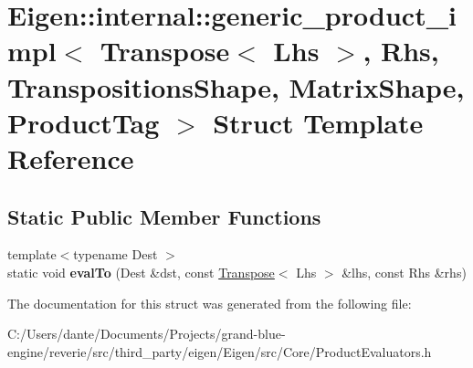\hypertarget{struct_eigen_1_1internal_1_1generic__product__impl_3_01_transpose_3_01_lhs_01_4_00_01_rhs_00_01_287c8e613c7656c0ce6593799fd7b329}{}\section{Eigen\+::internal\+::generic\+\_\+product\+\_\+impl$<$ Transpose$<$ Lhs $>$, Rhs, Transpositions\+Shape, Matrix\+Shape, Product\+Tag $>$ Struct Template Reference}
\label{struct_eigen_1_1internal_1_1generic__product__impl_3_01_transpose_3_01_lhs_01_4_00_01_rhs_00_01_287c8e613c7656c0ce6593799fd7b329}
\subsection*{Static Public Member Functions}
\begin{DoxyCompactItemize}
\item 
\mbox{\label{struct_eigen_1_1internal_1_1generic__product__impl_3_01_transpose_3_01_lhs_01_4_00_01_rhs_00_01_287c8e613c7656c0ce6593799fd7b329_a5c70fdb138733ffb2bb8ed8b41e998d8}} 
{\footnotesize template$<$typename Dest $>$ }\\static void {\bfseries eval\+To} (Dest \&dst, const \mbox{\hyperlink{class_eigen_1_1_transpose}{Transpose}}$<$ Lhs $>$ \&lhs, const Rhs \&rhs)
\end{DoxyCompactItemize}


The documentation for this struct was generated from the following file\+:\begin{DoxyCompactItemize}
\item 
C\+:/\+Users/dante/\+Documents/\+Projects/grand-\/blue-\/engine/reverie/src/third\+\_\+party/eigen/\+Eigen/src/\+Core/Product\+Evaluators.\+h\end{DoxyCompactItemize}

